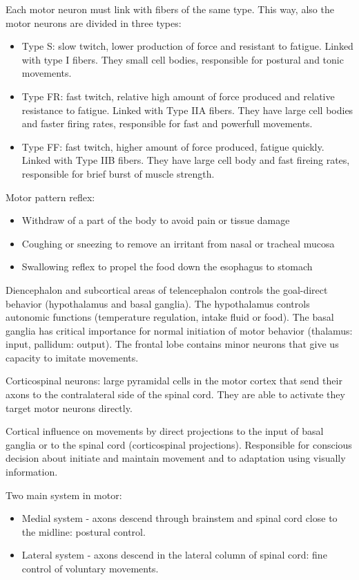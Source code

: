 \documentclass[12pt,article,oneside,a4paper]{memoir}
\begin{document}
Each motor neuron must link with fibers of the same type. This way, also the motor neurons are divided in three types:
\begin{itemize}
\item Type S: slow twitch, lower production of force and resistant to fatigue. Linked with type I fibers. They small cell bodies, responsible for postural and tonic movements.
\item Type FR: fast twitch, relative high amount of force produced and relative resistance to fatigue. Linked with Type IIA fibers. They have large cell bodies and faster firing rates, responsible for fast and powerfull movements.
\item Type FF: fast twitch, higher amount of force produced, fatigue quickly. Linked with Type IIB fibers. They have large cell body and fast fireing rates, responsible for brief burst of muscle strength.
\end{itemize}



Motor pattern reflex:
\begin{itemize}
\item Withdraw of a part of the body to avoid pain or tissue damage
\item Coughing or sneezing to remove an irritant from nasal or tracheal mucosa
\item Swallowing reflex to propel the food down the esophagus to stomach
\end{itemize}

Diencephalon and subcortical areas of telencephalon controls the goal-direct behavior (hypothalamus and basal ganglia). The hypothalamus controls autonomic functions (temperature regulation, intake fluid or food). The basal ganglia has critical importance for normal initiation of motor behavior (thalamus: input, pallidum: output). The frontal lobe contains minor neurons that give us capacity to imitate movements.

Corticospinal neurons: large pyramidal cells in the motor cortex that send their axons to the contralateral side of the spinal cord. They are able to activate they target motor neurons directly.

Cortical influence on movements by direct projections to the input of basal ganglia or to the spinal cord (corticospinal projections). Responsible for conscious decision about initiate and maintain movement and to adaptation using visually information.

Two main system in motor:
\begin{itemize}
\item Medial system - axons descend through brainstem and spinal cord close to the midline: postural control.
\item Lateral system - axons descend in the lateral column of spinal cord: fine control of voluntary movements.
\end{itemize}
\end{document}
